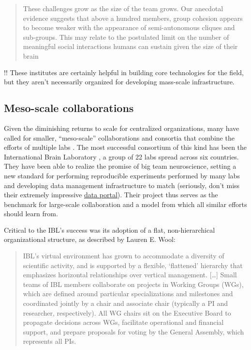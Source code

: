 \documentclass[10pt]{tufte-book}
\begin{document}
\begin{quote}
These challenges grow as the size of the team grows. Our anecdotal
evidence suggests that above a hundred members, group cohesion appears
to become weaker with the appearance of semi-autonomous cliques and
sub-groups. This may relate to the postulated limit on the number of
meaningful social interactions humans can sustain given the size of
their brain \citep{kochBigScienceTeam2016} 
\end{quote}

!! These institutes are certainly helpful in building core technologies
for the field, but they aren't necessarily organized for developing
mass-scale infrastructure.


\subsection{Meso-scale
collaborations}

Given the diminishing returns to scale for centralized organizations,
many have called for smaller, ``meso-scale'' collaborations and
consortia that combine the efforts of multiple labs \citep{mainenBetterWayCrack2016} . The most successful consortium of this
kind has been the International Brain Laboratory \citep{abbottInternationalLaboratorySystems2017, woolKnowledgeNetworksHow2020} , a group of 22 labs spread across six countries. They have been
able to realize the promise of big team neuroscience, setting a new
standard for performing reproducible experiments performed by many labs
\citep{laboratoryStandardizedReproducibleMeasurement2020}  and
developing data management infrastructure to match \citep{laboratoryDataArchitectureLargescale2020}  (seriously, don't miss
their extremely impressive
\href{https://data.internationalbrainlab.org/}{data portal}). Their
project thus serves as the benchmark for large-scale collaboration and a
model from which all similar efforts should learn from.

Critical to the IBL's success was its adoption of a flat,
non-hierarchical organizational structure, as described by Lauren E.
Wool:

\begin{quote}
IBL's virtual environment has grown to accommodate a diversity of
scientific activity, and is supported by a flexible, `flattened'
hierarchy that emphasizes horizontal relationships over vertical
management. {[}\ldots{]} Small teams of IBL members collaborate on
projects in Working Groups (WGs), which are defined around particular
specializations and milestones and coordinated jointly by a chair and
associate chair (typically a PI and researcher, respectively). All WG
chairs sit on the Executive Board to propagate decisions across WGs,
facilitate operational and financial support, and prepare proposals for
voting by the General Assembly, which represents all PIs. \citep{woolKnowledgeNetworksHow2020} 
\end{quote}
\end{document}
